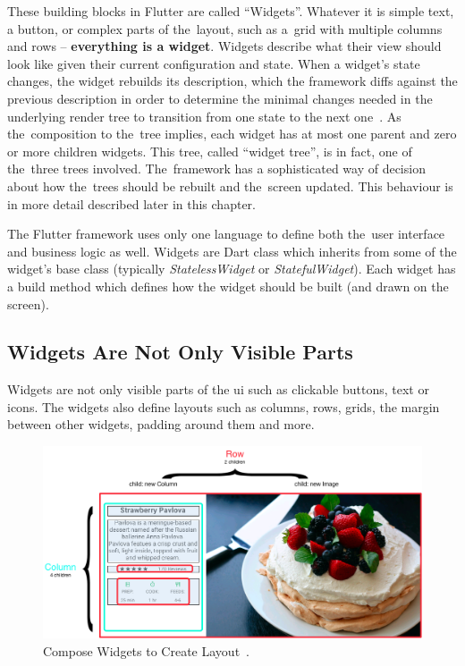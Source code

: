 These building blocks in Flutter are called ``Widgets''. Whatever it is simple text, a button, or complex parts of the~layout, such as a~grid with multiple columns and rows -- \textbf{everything is a widget}.  Widgets describe what their view should look like given their current configuration and state. When a widget's state changes, the widget rebuilds its description, which the framework diffs against the previous description in order to determine the minimal changes needed in the underlying render tree to transition from one state to the next one~\cite{flutter-widget-intro}. As the~composition to the~tree implies, each widget has at most one parent and zero or more children widgets. This tree, called ``widget tree'', is in fact, one of the~three trees involved. The~framework has a sophisticated way of decision about how the~trees should be rebuilt and the~screen updated. This behaviour is in more detail described later in this chapter.

The Flutter framework uses only one language to define both the~user interface and business logic as well.  Widgets are Dart class which inherits from some of the widget's base class (typically \textit{StatelessWidget} or \textit{StatefulWidget}). Each widget has a build method which defines how the widget should be built (and drawn on the screen). 
\subsection{Widgets Are Not Only Visible Parts}
Widgets are not only visible parts of the \gls{ui} such as clickable buttons, text or icons. The widgets also define layouts such as columns, rows, grids, the margin between other widgets, padding around them and more. 

\begin{figure}[htp]
    \centering
    \includegraphics[width=0.9\linewidth]{img/flutter/layout_compose.png}
    \caption{Compose Widgets to Create Layout~\cite{flutter-widget-layout}.}
    \label{fig:flutter-compose-widget}
\end{figure}

